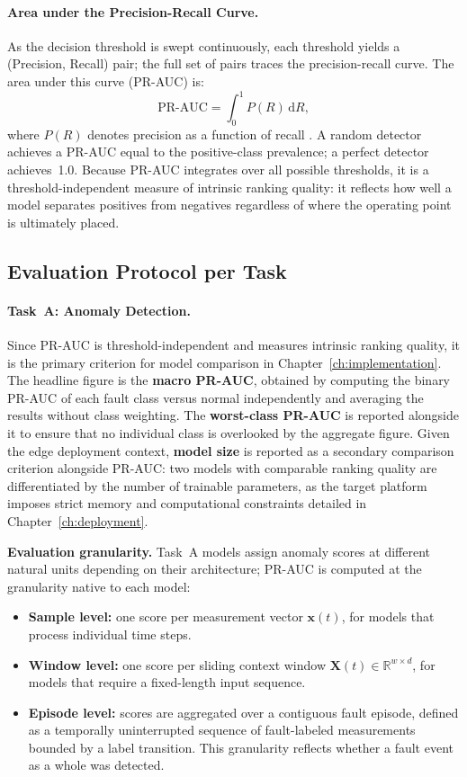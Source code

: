 \paragraph{Area under the Precision-Recall Curve.}
As the decision threshold is swept continuously, each threshold yields a (Precision, Recall) pair; the full set of pairs traces the precision-recall curve. The area under this curve (PR-AUC) is:
\[
  \mathrm{PR\text{-}AUC} = \int_0^1 P(R)\,\mathrm{d}R,
\]
where $P(R)$ denotes precision as a function of recall \citep{saito2015pr}. A random detector achieves a PR-AUC equal to the positive-class prevalence; a perfect detector achieves~1.0. Because PR-AUC integrates over all possible thresholds, it is a threshold-independent measure of intrinsic ranking quality: it reflects how well a model separates positives from negatives regardless of where the operating point is ultimately placed.

\subsection{Evaluation Protocol per Task}

\paragraph{Task~A: Anomaly Detection.}

Since PR-AUC is threshold-independent and measures intrinsic ranking quality, it is the primary criterion for model comparison in Chapter~\ref{ch:implementation}. The headline figure is the \textbf{macro PR-AUC}, obtained by computing the binary PR-AUC of each fault class versus normal independently and averaging the results without class weighting. The \textbf{worst-class PR-AUC} is reported alongside it to ensure that no individual class is overlooked by the aggregate figure. Given the edge deployment context, \textbf{model size} is reported as a secondary comparison criterion alongside PR-AUC: two models with comparable ranking quality are differentiated by the number of trainable parameters, as the target platform imposes strict memory and computational constraints detailed in Chapter~\ref{ch:deployment}.

\textbf{Evaluation granularity.} Task~A models assign anomaly scores at different natural units depending on their architecture; PR-AUC is computed at the granularity native to each model:
\begin{itemize}
  \item \textbf{Sample level:} one score per measurement vector $\mathbf{x}(t)$, for models that process individual time steps.
  \item \textbf{Window level:} one score per sliding context window $\mathbf{X}(t) \in \mathbb{R}^{w \times d}$, for models that require a fixed-length input sequence.
  \item \textbf{Episode level:} scores are aggregated over a contiguous fault episode, defined as a temporally uninterrupted sequence of fault-labeled measurements bounded by a label transition. This granularity reflects whether a fault event as a whole was detected.
\end{itemize}

